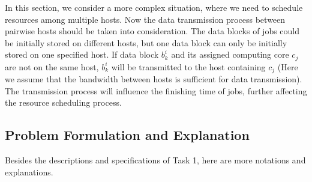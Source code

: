 \documentclass{llncs}
\begin{document}
In this section, we consider a more complex situation, where we need to schedule resources among multiple hosts. Now the data transmission process between pairwise hosts should be taken into consideration. The data blocks of jobs could be initially stored on different hosts, but one data block can only be initially stored on one specified host. If data block $b^i_{k}$ and its assigned computing core $c_j$ are not on the same host, $b^i_{k}$ will be transmitted to the host containing $c_j$ (Here we assume that the bandwidth between hosts is sufficient for data transmission). The transmission process will influence the finishing time of jobs, further affecting the resource scheduling process.

\subsection{Problem Formulation and Explanation}

Besides the descriptions and specifications of Task 1, here are more notations and explanations.
\end{document}
